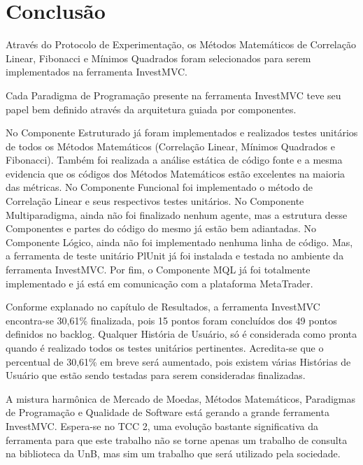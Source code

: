 \chapter{Conclusão}
Através do Protocolo de Experimentação, os Métodos Matemáticos de Correlação Linear, Fibonacci e Mínimos Quadrados foram selecionados para serem implementados na ferramenta InvestMVC. 

Cada Paradigma de Programação presente na ferramenta InvestMVC teve seu papel bem definido através da arquitetura guiada por componentes. 

No Componente Estruturado já foram implementados e realizados testes unitários de todos os Métodos Matemáticos (Correlação Linear, Mínimos Quadrados e Fibonacci). Também foi realizada a análise estática de código fonte e a mesma evidencia que os códigos dos Métodos Matemáticos estão excelentes na maioria das métricas. No Componente Funcional foi implementado o método de Correlação Linear e seus respectivos testes unitários. No Componente Multiparadigma, ainda não foi finalizado nenhum agente, mas a estrutura desse Componentes e partes do código do mesmo já estão bem adiantadas. No Componente Lógico, ainda não foi implementado nenhuma linha de código. Mas, a ferramenta de teste unitário PlUnit já foi instalada e testada no ambiente da ferramenta InvestMVC. Por fim, o Componente MQL já foi totalmente implementado e já está em comunicação com a plataforma MetaTrader.

Conforme explanado no capítulo de Resultados, a ferramenta InvestMVC encontra-se 30,61\% finalizada, pois 15 pontos foram concluídos dos 49 pontos definidos no backlog. Qualquer História de Usuário, só é considerada como pronta quando é realizado todos os testes unitários pertinentes. Acredita-se que o percentual de 30,61\% em breve será aumentado, pois existem várias Histórias de Usuário que estão sendo testadas para serem consideradas finalizadas.

A mistura harmônica de Mercado de Moedas, Métodos Matemáticos, Paradigmas de Programação e Qualidade de Software está gerando a grande ferramenta InvestMVC. Espera-se no TCC 2, uma evolução bastante significativa da  ferramenta para que este trabalho não se torne apenas um trabalho de consulta na biblioteca da UnB, mas sim um trabalho que será utilizado pela sociedade.
